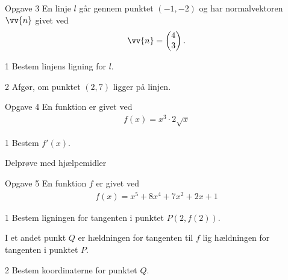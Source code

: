 \begin{opgavetekst}{Opgave 3}
	En linje $l$ går gennem punktet $(-1,-2)$ og har normalvektoren $\vv{n}$ givet ved
	\begin{align*}
		\vv{n} = 
		\begin{pmatrix}
			4 \\ 3
		\end{pmatrix}.
	\end{align*}	
\end{opgavetekst}
\begin{delopgave}{}{1}
	Bestem linjens ligning for $l$. 
\end{delopgave}
\begin{delopgave}{}{2}
	Afgør, om punktet $(2,7)$ ligger på linjen. 
\end{delopgave}
\newpage
\begin{opgavetekst}{Opgave 4}
	En funktion er givet ved
	\begin{align*}
		f(x) = x^3\cdot 2\sqrt{x}
	\end{align*}
\end{opgavetekst}
\begin{delopgave}{}{1}
	Bestem $f'(x)$. 
\end{delopgave}


\newpage
\begin{center}
\LARGE
Delprøve med hjælpemidler 
\end{center}
\begin{opgavetekst}{Opgave 5}
	En funktion $f$ er givet ved
	\begin{align*}
		f(x) = x^5 + 8x^4+7x^2+2x+1
	\end{align*}
\end{opgavetekst}
\begin{delopgave}{}{1}
	Bestem ligningen for tangenten i punktet $P(2,f(2))$.
\end{delopgave}
\begin{meretekst}
	I et andet punkt $Q$ er hældningen for tangenten til $f$ lig hældningen for tangenten i punktet $P$. 
\end{meretekst}
\begin{delopgave}{}{2}
	Bestem koordinaterne for punktet $Q$.
\end{delopgave}

